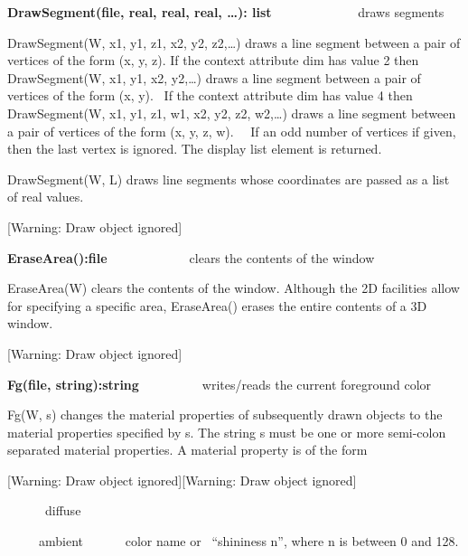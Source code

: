\documentclass[letterpaper]{article}
\begin{document}
{
\textsf{\textbf{DrawSegment(file, real, real, real, {\dots}): list}} \ \ \ \ \ \  \ \ \ \ \ \ \ draws segments}


\bigskip

{
\textsf{DrawSegment(W, x1, y1, z1, x2, y2, z2,{\dots})} draws a line segment between a pair of vertices of the form (x,
y, z). If the context attribute \textsf{dim} has value 2 then \textsf{DrawSegment(W, x1, y1, x2, y2,{\dots})} draws a
line segment between a pair of vertices of the form (x, y). \ If the context attribute \textsf{dim }has value 4 then
\textsf{DrawSegment(W, x1, y1, z1, w1, x2, y2, z2, w2,{\dots})} draws a line segment between a pair of vertices of the
form (x, y, z, w). \ \ If an odd number of vertices if given, then the last vertex is ignored. The display list element
is returned. }


\bigskip

{
DrawSegment(W, L) draws line segments whose coordinates are passed as a list of real values.}


\bigskip

[Warning: Draw object ignored]

{
\textsf{\textbf{EraseArea():file}}\ \ \ \ \ \ \ \ \ \  \ \ \ clears the contents of the window}


\bigskip

{
\textsf{EraseArea(W)} clears the contents of the window. Although the 2D facilities allow for specifying a specific
area, \textsf{EraseArea() }erases the entire contents of a 3D window. }

[Warning: Draw object ignored]

{
\textsf{\textbf{Fg(file, string):string}}\ \ \ \ \ \  \ \ \ \ writes/reads the current foreground color }


\bigskip

{
\textsf{Fg(W, s)} changes the material properties of subsequently drawn objects to the material properties specified by
s. The string s must be one or more semi-colon separated material properties. A material property is of the form }

[Warning: Draw object ignored][Warning: Draw object ignored]

{
\ \ \ \ \ \ diffuse}

{
\ \ \ \ \ ambient \ \ \ \ \ \ color name or \ {}``shininess n'', where n is between 0 and 128. }
\end{document}
